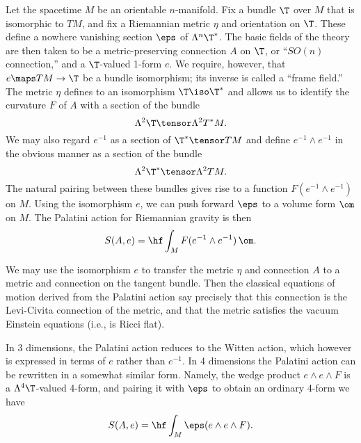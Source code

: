 Let the spacetime $M$ be an orientable $n$-manifold.    Fix a bundle $\T$
over $M$ that is isomorphic to $TM$, and fix a Riemannian metric $\eta$ and
orientation on $\T$.   These define a nowhere vanishing section $\eps$ of
$\Lambda^n \T^\ast$.   The basic fields of the theory are then taken to be
a metric-preserving connection $A$ on $\T$, or ``$SO(n)$ connection,'' and
a $\T$-valued 1-form $e$.  We require, however, that $e \maps TM \to \T$ be
a bundle isomorphism; its inverse is called a ``frame field.''  The metric
$\eta$ defines to an isomorphism $\T \iso \T^\ast$ and allows us to identify
the curvature $F$ of $A$ with a section of the bundle
\[         \Lambda^2 \T \tensor \Lambda^2 T^\ast M .\]
We may also regard $e^{-1}$ as a section of $\T^\ast \tensor TM$ and define
$e^{-1} \wedge e^{-1}$ in the obvious manner as a section of the bundle
\[          \Lambda^2 \T^\ast \tensor \Lambda^2 TM .\]
The natural pairing between these bundles gives rise to a function
$F(e^{-1} \wedge e^{-1})$ on $M$.
Using the isomorphism $e$, we can push forward $\eps$
to a volume form $\om$ on $M$.
The Palatini action for Riemannian gravity is then
\[        S(A,e) = \hf \int_M F(e^{-1} \wedge e^{-1})\, \om .\]

We may use the isomorphism $e$ to transfer the metric $\eta$ and
connection $A$ to a metric and connection on the tangent bundle.  Then the
classical equations of motion derived from the Palatini action say
precisely that this connection is the Levi-Civita connection of the metric,
and that the metric satisfies the vacuum Einstein equations (i.e., is Ricci
flat).

In 3 dimensions, the Palatini action reduces to the Witten action, which
however is expressed in terms of $e$ rather than $e^{-1}$.   In 4
dimensions the Palatini action can be rewritten in a somewhat similar form.
Namely, the wedge product $e \wedge e \wedge F$ is a $\Lambda^4 \T$-valued
4-form, and pairing it with $\eps$ to obtain an ordinary 4-form we have
\[       S(A,e) = \hf\int_M \eps(e \wedge e \wedge F) .\]

